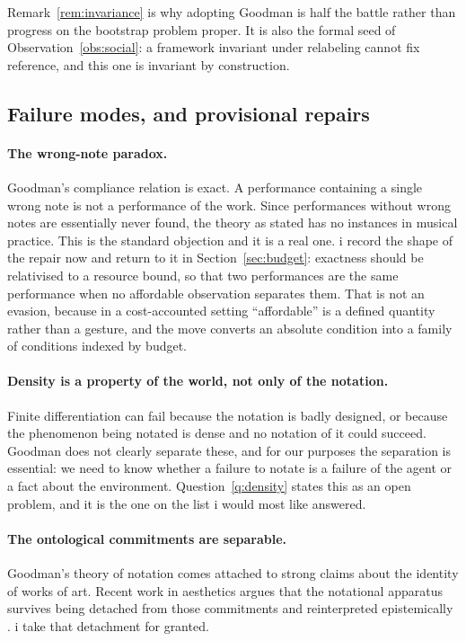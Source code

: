 \noindent
Remark~\ref{rem:invariance} is why adopting Goodman is half the
battle rather than progress on the bootstrap problem proper.
It is also the formal seed of Observation~\ref{obs:social}: a
framework invariant under relabeling cannot fix reference, and
this one is invariant by construction.

\subsection{Failure modes, and provisional repairs}
\label{sec:failures}

\paragraph{The wrong-note paradox.}
Goodman's compliance relation is exact.
A performance containing a single wrong note is not a performance
of the work.
Since performances without wrong notes are essentially never found,
the theory as stated has no instances in musical practice.
This is the standard objection and it is a real one.
i record the shape of the repair now and return to it in
Section~\ref{sec:budget}: exactness should be relativised to a
resource bound, so that two performances are the same performance
when no affordable observation separates them.
That is not an evasion, because in a cost-accounted setting
``affordable'' is a defined quantity rather than a gesture, and the
move converts an absolute condition into a family of conditions
indexed by budget.

\paragraph{Density is a property of the world, not only of the notation.}
Finite differentiation can fail because the notation is badly
designed, or because the phenomenon being notated is dense and no
notation of it could succeed.
Goodman does not clearly separate these, and for our purposes the
separation is essential: we need to know whether a failure to
notate is a failure of the agent or a fact about the environment.
Question~\ref{q:density} states this as an open problem, and it is
the one on the list i would most like answered.

\paragraph{The ontological commitments are separable.}
Goodman's theory of notation comes attached to strong claims about
the identity of works of art.
Recent work in aesthetics argues that the notational apparatus
survives being detached from those commitments and reinterpreted
epistemically \cite{estetika2026}.
i take that detachment for granted.

